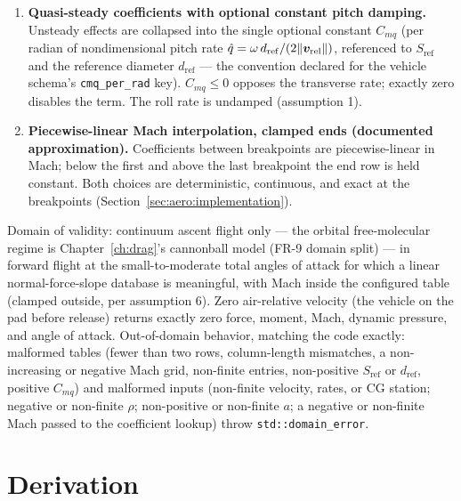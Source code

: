 \begin{enumerate}
    and the normal force acts at the center-of-pressure station
    $x_{cp}(M)$ on the axis. Lateral CG offsets of the FR-13 stacks
    (whose sub-blocks are nominally axisymmetric) are neglected; the
    induced moment error is of order (lateral offset) $\times$ (force),
    second-order for near-axis CGs.
  \item \textbf{Quasi-steady coefficients with optional constant pitch
    damping.} Unsteady effects are collapsed into the single optional
    constant $C_{mq}$ (per radian of nondimensional pitch rate
    $\hat{q} = \omega\, d_{\mathrm{ref}} / (2\lVert \bm{v}_{\mathrm{rel}}
    \rVert)$, referenced to $S_{\mathrm{ref}}$ and the reference diameter
    $d_{\mathrm{ref}}$ --- the convention declared for the vehicle
    schema's \texttt{cmq\_per\_rad} key). $C_{mq} \le 0$ opposes the
    transverse rate; exactly zero disables the term. The roll rate is
    undamped (assumption 1).
  \item \textbf{Piecewise-linear Mach interpolation, clamped ends
    (documented approximation).} Coefficients between breakpoints are
    piecewise-linear in Mach; below the first and above the last
    breakpoint the end row is held constant. Both choices are
    deterministic, continuous, and exact at the breakpoints
    (Section~\ref{sec:aero:implementation}).
\end{enumerate}

Domain of validity: continuum ascent flight only --- the orbital
free-molecular regime is Chapter~\ref{ch:drag}'s cannonball model (FR-9
domain split) --- in forward flight at the small-to-moderate total angles
of attack for which a linear normal-force-slope database is meaningful,
with Mach inside the configured table (clamped outside, per assumption 6).
Zero air-relative velocity (the vehicle on the pad before release) returns
exactly zero force, moment, Mach, dynamic pressure, and angle of attack.
Out-of-domain behavior, matching the code exactly: malformed tables
(fewer than two rows, column-length mismatches, a non-increasing or
negative Mach grid, non-finite entries, non-positive $S_{\mathrm{ref}}$ or
$d_{\mathrm{ref}}$, positive $C_{mq}$) and malformed inputs (non-finite
velocity, rates, or CG station; negative or non-finite $\rho$;
non-positive or non-finite $a$; a negative or non-finite Mach passed to
the coefficient lookup) throw \texttt{std::domain\_error}.

\section{Derivation}
\label{sec:aero:derivation}

